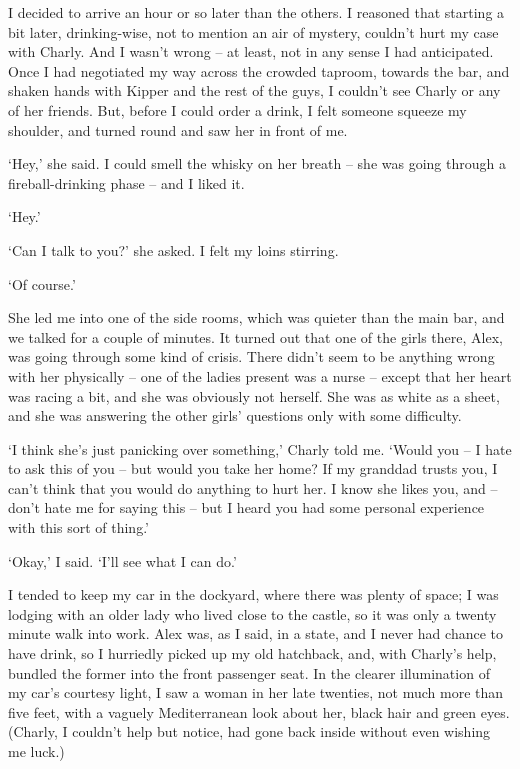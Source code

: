 I decided to arrive an hour or so later than the others. I reasoned that starting a bit later, drinking-wise, not to mention an air of mystery, couldn't hurt my case with Charly. And I wasn't wrong -- at least, not in any sense I had anticipated. Once I had negotiated my way across the crowded taproom, towards the bar, and shaken hands with Kipper and the rest of the guys, I couldn't see Charly or any of her friends. But, before I could order a drink, I felt someone squeeze my shoulder, and turned round and saw her in front of me.

`Hey,' she said. I could smell the whisky on her breath -- she was going through a fireball-drinking phase -- and I liked it.

`Hey.'

`Can I talk to you?' she asked. I felt my loins stirring.

`Of course.'

She led me into one of the side rooms, which was quieter than the main bar, and we talked for a couple of minutes. It turned out that one of the girls there, Alex, was going through some kind of crisis. There didn't seem to be anything wrong with her physically -- one of the ladies present was a nurse -- except that her heart was racing a bit, and she was obviously not herself. She was as white as a sheet, and she was answering the other girls' questions only with some difficulty.

`I think she's just panicking over something,' Charly told me. `Would you -- I hate to ask this of you -- but would you take her home? If my granddad trusts you, I can't think that you would do anything to hurt her. I know she likes you, and -- don't hate me for saying this -- but I heard you had some personal experience with this sort of thing.'

`Okay,' I said. `I'll see what I can do.'

I tended to keep my car in the dockyard, where there was plenty of space; I was lodging with an older lady who lived close to the castle, so it was only a twenty minute walk into work. Alex was, as I said, in a state, and I never had chance to have drink, so I hurriedly picked up my old hatchback, and, with Charly's help, bundled the former into the front passenger seat. In the clearer illumination of my car's courtesy light, I saw a woman in her late twenties, not much more than five feet, with a vaguely Mediterranean look about her, black hair and green eyes. (Charly, I couldn't help but notice, had gone back inside without even wishing me luck.)

